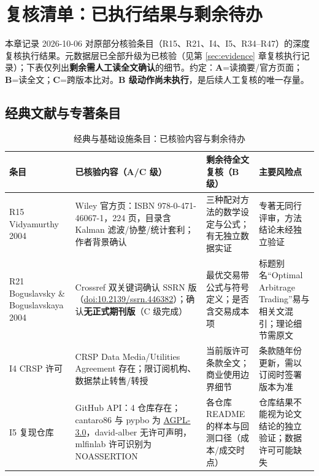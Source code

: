 \section{复核清单：已执行结果与剩余待办}\label{sec:checklist}

本章记录 2026-10-06 对原\textsc{部分核验}条目（R15、R21、I4、I5、R34--R47）的深度复核执行结果。元数据层已全部升级为\textsc{已核验}（见第 \ref{sec:evidence} 章复核执行记录）；下表仅列出\textbf{剩余需人工读全文确认}的细节。约定：\textbf{A}=读摘要/官方页面；\textbf{B}=读全文；\textbf{C}=跨版本比对。\textbf{B 级动作尚未执行}，是后续人工复核的唯一存量。

\subsection{经典文献与专著条目}

\begin{table}[htbp]
\centering
\caption{经典与基础设施条目：已核验内容与剩余待办}
\label{tab:checklist_classic}
\footnotesize
\begin{tabular}{@{}>{\raggedright\arraybackslash}p{1.5cm}>{\raggedright\arraybackslash}p{4.4cm}>{\raggedright\arraybackslash}p{4.2cm}>{\raggedright\arraybackslash}p{4.0cm}@{}}
\toprule
条目 & 已核验内容（A/C 级） & 剩余待全文复核（B 级） & 主要风险点 \\
\midrule
R15 Vidyamurthy 2004 & Wiley 官方页：ISBN 978-0-471-46067-1，224 页，目录含 Kalman 滤波/协整/统计套利；作者背景确认 & 三种配对方法的数学设定与公式；有无独立数据实证 & 专著无同行评审，方法结论未经独立验证 \\
R21 Boguslavsky \& Boguslavskaya 2004 & Crossref 双关键词确认 SSRN 版（\href{https://doi.org/10.2139/ssrn.446382}{doi:10.2139/ssrn.446382}）；确认\textbf{无正式期刊版}（C 级完成） & 最优交易带公式与符号定义；是否含交易成本项 & 标题别名“Optimal Arbitrage Trading”易与相关文混引；理论细节需原文 \\
I4 CRSP 许可 & CRSP Data Media/Utilities Agreement 存在；限订阅机构、数据禁止转售/转授 & 当前版许可条款全文；商业使用边界细节 & 条款随年份更新，需以订阅时签署版本为准 \\
I5 复现仓库 & GitHub API：4 仓库存在；cantaro86 与 pypbo 为 \href{https://github.com/esvhd/pypbo}{AGPL-3.0}，david-alber 无许可声明，mlfinlab 许可识别为 NOASSERTION & 各仓库 README 的样本与回测口径（成本/成交时点） & 仓库结果不能视为论文结论的独立验证；数据许可可能缺失 \\
\bottomrule
\end{tabular}
\end{table}

